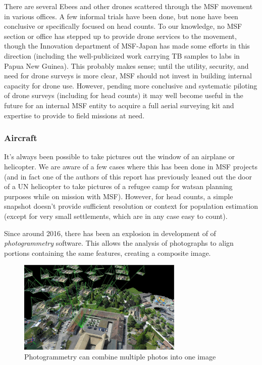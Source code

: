 \documentclass[a4paper,12pt,twoside]{article}
\begin{document}
There are several Ebees and other drones scattered through the MSF movement in various offices. A few informal trials have been done, but none have been conclusive or specifically focused on head counts. To our knowledge, no MSF section or office has stepped up to provide drone services to the movement, though the Innovation department of MSF-Japan has made some efforts in this direction (including the well-publicized work carrying TB samples to labs in Papua New Guinea). This probably makes sense; until the utility, security, and need for drone surveys is more clear, MSF should not invest in building internal capacity for drone use. However, pending more conclusive and systematic piloting of drone surveys (including for head counts) it may well become useful in the future for an internal MSF entity to acquire a full aerial surveying kit and expertise to provide to field missions at need. 

\subsubsection{Aircraft}
It's always been possible to take pictures out the window of an airplane or helicopter. We are aware of a few cases where this has been done in MSF projects (and in fact one of the authors of this report has previously leaned out the door of a UN helicopter to take pictures of a refugee camp for watsan planning purposes while on mission with MSF). However, for head counts, a simple snapshot doesn't provide sufficient resolution or context for population estimation (except for very small settlements, which are in any case easy to count).  

Since around 2016, there has been an explosion in development of of \textit{photogrammetry} software. This allows the analysis of photographs to align portions containing the same features, creating a composite image. 

\begin{figure}[H]
    \centering
    \includegraphics[width=0.7\textwidth]{images/rayCloud-pix4d-parallax-black.jpg}
    \caption{Photogrammetry can combine multiple photos into one image}
    \label{fig:Photogrammetry}
\end{figure}
\end{document}
